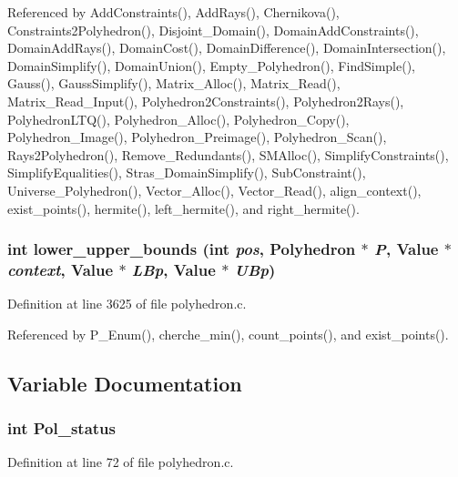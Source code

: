 Referenced by Add\-Constraints(), Add\-Rays(), Chernikova(), Constraints2Polyhedron(), Disjoint\_\-Domain(), Domain\-Add\-Constraints(), Domain\-Add\-Rays(), Domain\-Cost(), Domain\-Difference(), Domain\-Intersection(), Domain\-Simplify(), Domain\-Union(), Empty\_\-Polyhedron(), Find\-Simple(), Gauss(), Gauss\-Simplify(), Matrix\_\-Alloc(), Matrix\_\-Read(), Matrix\_\-Read\_\-Input(), Polyhedron2Constraints(), Polyhedron2Rays(), Polyhedron\-LTQ(), Polyhedron\_\-Alloc(), Polyhedron\_\-Copy(), Polyhedron\_\-Image(), Polyhedron\_\-Preimage(), Polyhedron\_\-Scan(), Rays2Polyhedron(), Remove\_\-Redundants(), SMAlloc(), Simplify\-Constraints(), Simplify\-Equalities(), Stras\_\-Domain\-Simplify(), Sub\-Constraint(), Universe\_\-Polyhedron(), Vector\_\-Alloc(), Vector\_\-Read(), align\_\-context(), exist\_\-points(), hermite(), left\_\-hermite(), and right\_\-hermite().

\subsubsection{\setlength{\rightskip}{0pt plus 5cm}int lower\_\-upper\_\-bounds (int {\em pos}, Polyhedron $\ast$ {\em P}, Value $\ast$ {\em context}, Value $\ast$ {\em LBp}, Value $\ast$ {\em UBp})}\label{polyhedron_8c_a49}




Definition at line 3625 of file polyhedron.c.

Referenced by P\_\-Enum(), cherche\_\-min(), count\_\-points(), and exist\_\-points().



\subsection{Variable Documentation}
\subsubsection{\setlength{\rightskip}{0pt plus 5cm}int Pol\_\-status}\label{polyhedron_8c_a5}




Definition at line 72 of file polyhedron.c.
